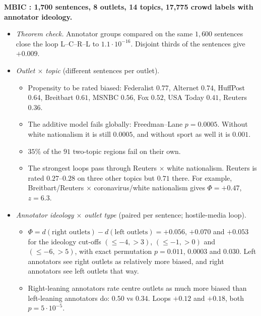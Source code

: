 \documentclass[11pt]{article}
\theoremstyle{definition}
\theoremstyle{remark}
\begin{document}
\textbf{MBIC \cite{mbic}: 1{,}700 sentences, 8 outlets, 14 topics, 17{,}775 crowd labels with annotator ideology.}
\begin{itemize}
  \item \emph{Theorem check.} Annotator groups compared on the same $1{,}600$ sentences close the loop L--C--R--L to $1.1\cdot10^{-16}$. Disjoint thirds of the sentences give $+0.009$.
  \item \emph{Outlet $\times$ topic} (different sentences per outlet).
  \begin{itemize}
    \item Propensity to be rated biased: Federalist $0.77$, Alternet $0.74$, HuffPost $0.64$, Breitbart $0.61$, MSNBC $0.56$, Fox $0.52$, USA Today $0.41$, Reuters $0.36$.
    \item The additive model fails globally: Freedman--Lane $p=0.0005$. Without white nationalism it is still $0.0005$, and without sport as well it is $0.001$.
    \item $35\%$ of the $91$ two-topic regions fail on their own.
    \item The strongest loops pass through Reuters $\times$ white nationalism. Reuters is rated $0.27$--$0.28$ on three other topics but $0.71$ there. For example, Breitbart/Reuters $\times$ coronavirus/white nationalism gives $\Phi=+0.47$, $z=6.3$.
  \end{itemize}
  \item \emph{Annotator ideology $\times$ outlet type} (paired per sentence; hostile-media loop).
  \begin{itemize}
    \item $\Phi=d(\text{right outlets})-d(\text{left outlets})=+0.056$, $+0.070$ and $+0.053$ for the ideology cut-offs $(\le-4,>3)$, $(\le-1,>0)$ and $(\le-6,>5)$, with exact permutation $p=0.011$, $0.0003$ and $0.030$. Left annotators see right outlets as relatively more biased, and right annotators see left outlets that way.
    \item Right-leaning annotators rate centre outlets as much more biased than left-leaning annotators do: $0.50$ vs $0.34$. Loops $+0.12$ and $+0.18$, both $p=5\cdot10^{-5}$.
  \end{itemize}
\end{itemize}
\end{document}
